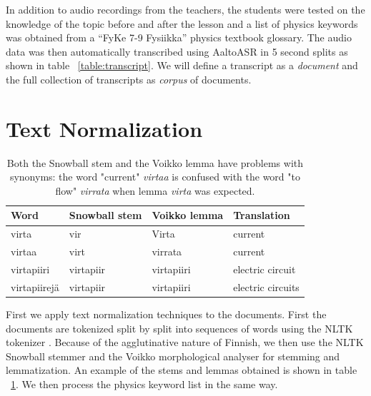 \documentclass[utf8,english]{gradu3}
\begin{document}
In addition to audio recordings from the teachers, the students were tested on the knowledge of the topic before and after the lesson and a list of physics keywords was obtained from a \enquote{FyKe 7-9 Fysiikka}\parencite{kangaskorteFyKeFysiikkaOPS2016} physics textbook glossary. The audio data was then automatically transcribed using AaltoASR in 5 second splits \parencite{hirsimakiImportanceHighOrderNGram2009} as shown in table ~\ref{table:transcript}. We will define a transcript as a \emph{document} and the full collection of transcripts as \emph{corpus} of documents.



\section{Text Normalization}

\begin{table}[]
  \begin{tabular}{ | l | l | l | l | }
  \hline
  \textbf{Word} & \textbf{Snowball stem} & \textbf{Voikko lemma} & \textbf{Translation} \\ \hline
  virta & vir & Virta & current\\ \hline
  virtaa & virt & virrata & current\\ \hline
  virtapiiri & virtapiir & virtapiiri & electric circuit\\ \hline
  virtapiirejä & virtapiir & virtapiiri & electric circuits\\
  \hline
  \end{tabular}
  \caption{Both the Snowball stem and the Voikko lemma have problems with synonyms: the word "current" \emph{virtaa} is confused with the word "to flow" \emph{virrata} when lemma \emph{virta} was expected.}
  \label{table:stemmer}
\end{table}

First we apply text normalization techniques to the documents. First the documents are tokenized split by split into sequences of words using the NLTK tokenizer \parencite{birdNaturalLanguageProcessing2009}. Because of the agglutinative nature of Finnish, we then use the NLTK Snowball stemmer \parencite{birdNaturalLanguageProcessing2009} and the Voikko morphological analyser \parencite{pitkanenVoikkoFreeLinguistic2019}  for stemming and lemmatization. An example of the stems and lemmas obtained is shown in table ~\ref{table:stemmer}. We then process the physics keyword list in the same way. 
\end{document}
